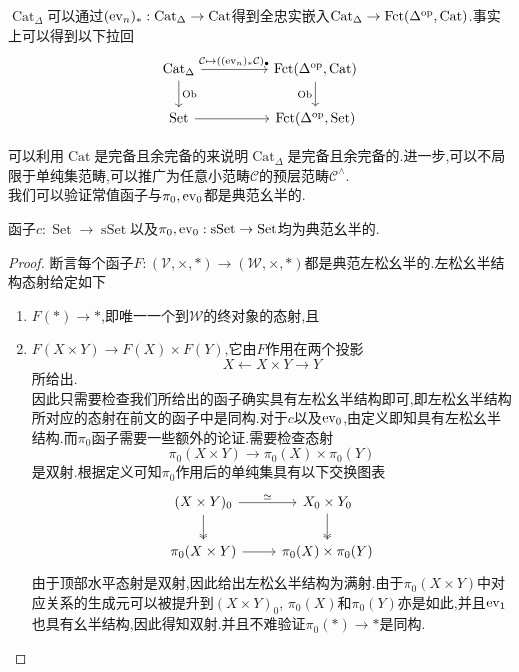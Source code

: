 \begin{lemma}
    $\operatorname{Cat}_{\Delta}$可以通过$(\operatorname{ev}_n)_*:\operatorname{Cat}_{\Delta} \to \operatorname{Cat}$得到全忠实嵌入$\operatorname{Cat}_{\Delta} \to \operatorname{Fct}(\Delta^{\operatorname{op}},\operatorname{Cat})$.事实上可以得到以下拉回
\[\begin{tikzcd}
	{\Cat_{\Delta}} && {\Fct(\Delta^{\opposite},\Cat)} \\
	{\operatorname{Set}} && {\Fct(\Delta^{\opposite},\operatorname{Set})}
	\arrow["{\mathcal{C}\mapsto ((\ev_n)_*\mathcal{C})_{\bullet}}", from=1-1, to=1-3]
	\arrow["{\operatorname{Ob}}", from=1-1, to=2-1]
	\arrow["{\operatorname{Ob}}"', from=1-3, to=2-3]
	\arrow[from=2-1, to=2-3]
\end{tikzcd}\]
\end{lemma}
可以利用$\operatorname{Cat}$是完备且余完备的来说明$\operatorname{Cat}_{\Delta}$是完备且余完备的.进一步,可以不局限于单纯集范畴,可以推广为任意小范畴$\mathcal{C}$的预层范畴$\mathcal{C}^{\land}$.\\
我们可以验证常值函子与$\pi_0,\operatorname{ev}_0$都是典范幺半的.
\begin{lemma}\label{引理:三个函子均幺半}
    函子$c: \operatorname{Set} \to \operatorname{sSet}$以及$\pi_0,\operatorname{ev}_0:\operatorname{sSet}\to \operatorname{Set}$均为典范幺半的.
\end{lemma}
\begin{proof}
    断言每个函子$F:(\mathcal{V},\times,*) \to (\mathcal{W},\times,*)$都是典范左松幺半的.左松幺半结构态射给定如下
    \begin{enumerate}
        \item $F(*) \to *$,即唯一一个到$\mathcal{W}$的终对象的态射,且
        \item $F(X\times Y) \to F(X) \times F(Y)$,它由$F$作用在两个投影
        \[
            X\leftarrow X\times Y \rightarrow Y
        \]
        所给出.\\
        因此只需要检查我们所给出的函子确实具有左松幺半结构即可,即左松幺半结构所对应的态射在前文的函子中是同构.对于$c$以及$\operatorname{ev}_0$,由定义即知具有左松幺半结构.而$\pi_0$函子需要一些额外的论证.需要检查态射
        \[
            \pi_0(X\times Y) \to \pi_0(X)\times \pi_0(Y)
        \]
        是双射.根据定义可知$\pi_0$作用后的单纯集具有以下交换图表
        \[\begin{tikzcd}
	    {(X\times Y)_0} & {X_0\times Y_0} \\
	    {\pi_0(X\times Y)} & {\pi_0(X)\times \pi_0(Y)}
	    \arrow["\simeq", from=1-1, to=1-2]
	    \arrow[two heads, from=1-1, to=2-1]
	    \arrow[two heads, from=1-2, to=2-2]
	    \arrow[from=2-1, to=2-2]
        \end{tikzcd}\]
        由于顶部水平态射是双射,因此给出左松幺半结构为满射.由于$\pi_0(X\times Y)$中对应关系的生成元可以被提升到$(X\times Y)_0$, $\pi_0(X)$和$\pi_0(Y)$亦是如此,并且$\operatorname{ev}_1$也具有幺半结构,因此得知双射.并且不难验证$\pi_0(*)\to*$是同构.
    \end{enumerate}
\end{proof}
